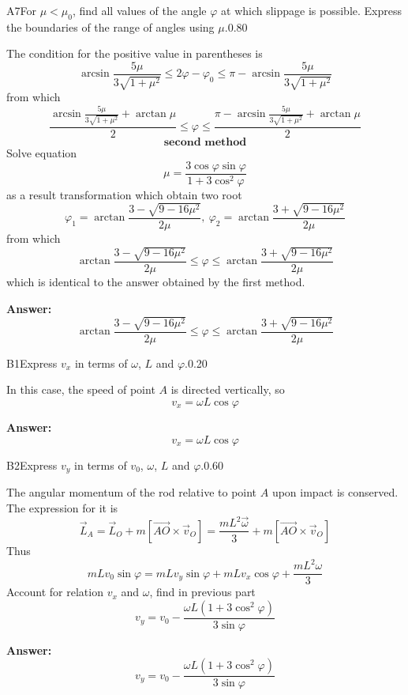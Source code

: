 \documentclass[11pt,a4paper]{article}
\begin{document}
\begin{solcard}{A7}{For $\mu<\mu_0$, find all values of the angle $\varphi$ at which slippage is possible. Express the boundaries of the range of angles using $\mu$.}{0.80}

The condition for the positive value in parentheses is $$\arcsin\frac{5\mu}{3\sqrt{1+\mu^2}}\leq{2\varphi-\varphi_0}\leq{\pi-\arcsin\frac{5\mu}{3\sqrt{1+\mu^2}}} $$ from which $$\frac{\arcsin\frac{5\mu}{3\sqrt{1+\mu^2}}+\arctan\mu}{2}\leq{\varphi}\leq{\frac{\pi-\arcsin\frac{5\mu}{3\sqrt{1+\mu^2}}+\arctan\mu}{2}} $$ $$\textbf{second method} $$ Solve equation $$\mu=\frac{3\cos{\varphi}\sin{\varphi}}{1+3\cos^2{\varphi}} $$ as a result transformation which obtain two root $$\varphi_1=\arctan{\frac{3-\sqrt{9-16\mu^2}}{2\mu}},\ \varphi_2=\arctan{\frac{3+\sqrt{9-16\mu^2}}{2\mu}} $$ from which $$\arctan{\frac{3-\sqrt{9-16\mu^2}}{2\mu}} \leq \varphi \leq \arctan{\frac{3+\sqrt{9-16\mu^2}}{2\mu}} $$ which is identical to the answer obtained by the first method.

\par\smallskip\noindent\textbf{Answer:} $$\arctan{\frac{3-\sqrt{9-16\mu^2}}{2\mu}} \leq \varphi \leq \arctan{\frac{3+\sqrt{9-16\mu^2}}{2\mu}} $$
\end{solcard}

\begin{solcard}{B1}{Express $v_x$ in terms of $\omega$, $L$ and $\varphi$.}{0.20}

In this case, the speed of point $A$ is directed vertically, so $$v_x=\omega L\cos\varphi $$

\par\smallskip\noindent\textbf{Answer:} $$v_x=\omega L\cos\varphi $$
\end{solcard}

\begin{solcard}{B2}{Express $v_y$ in terms of $v_0$, $\omega$, $L$ and $\varphi$.}{0.60}

The angular momentum of the rod relative to point $A$ upon impact is conserved. The expression for it is $$\vec{L}_A=\vec{L}_O+m[\vec{AO}\times\vec{v}_O]=\frac{mL^2\vec{\omega}}{3}+m[\vec{AO}\times\vec{v}_O] $$ Thus $$mLv_0\sin\varphi=mLv_y\sin\varphi+mLv_x\cos\varphi+\frac{mL^2\omega}{3} $$ Account for relation $v_x$ and $\omega$, find in previous part $$v_y=v_0-\frac{\omega L(1+3\cos^2\varphi)}{3\sin\varphi} $$

\par\smallskip\noindent\textbf{Answer:} $$v_y=v_0-\frac{\omega L(1+3\cos^2\varphi)}{3\sin\varphi} $$
\end{solcard}
\end{document}
